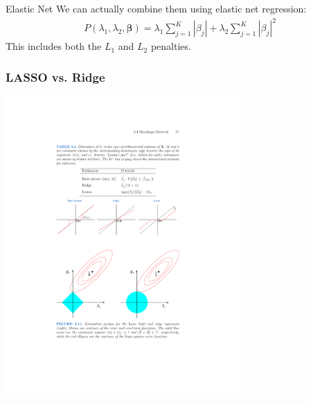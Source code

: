 \documentclass[xcolor=pdftex,dvipsnames,table,mathserif,aspectratio=169]{beamer}
\begin{document}
\begin{frame}{Elastic Net}
We can actually combine them using \alert{elastic net regression}:
\begin{eqnarray*}
 P(\lambda_1,\lambda_2,\mathbf{\beta}) =  \lambda _1\sum_{j=1}^K | \beta_j|  +\lambda_2 \sum_{j=1}^K | \beta_j|^2 
 \end{eqnarray*}
 This includes both the $L_1$ and $L_2$ penalties.
\end{frame}

\begin{frame}
\frametitle{LASSO vs. Ridge}
\begin{center}
\includegraphics[width=3.5in]{./resources/orthcompare}
\end{center}
\end{frame}
\end{document}
